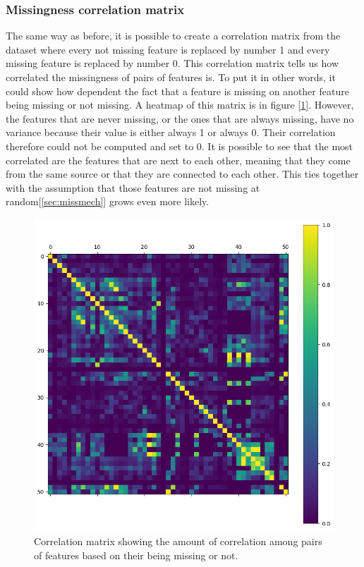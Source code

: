 \documentclass[11pt]{article}
\begin{document}
      \subsubsection{Missingness correlation matrix}
        The same way as before, it is possible to create a correlation matrix from the dataset where every not missing feature is replaced by number 1 and every missing feature is replaced by number 0. This correlation matrix tells us how correlated the missingness of pairs of features is. To put it in other words, it could show how dependent the fact that a feature is missing on another feature being missing or not missing. A heatmap of this matrix is in figure [\ref{figure:missingness_matrix}]. However, the features that are never missing, or the ones that are always missing, have no variance because their value is either always 1 or always 0. Their correlation therefore could not be computed and set to 0. It is possible to see that the most correlated are the features that are next to each other, meaning that they come from the same source or that they are connected to each other. This ties together with the assumption that those features are not missing at random[\ref{sec:missmech}] grows even more likely.
        \begin{figure}
          \centering
          \caption{Correlation matrix showing the amount of correlation among pairs of features based on their being missing or not.}
          \label{figure:missingness_matrix}
          \includegraphics[scale=0.6]{thesis_res/corr/heatmap_cropped.png}
        \end{figure}
      \newpage
\end{document}
